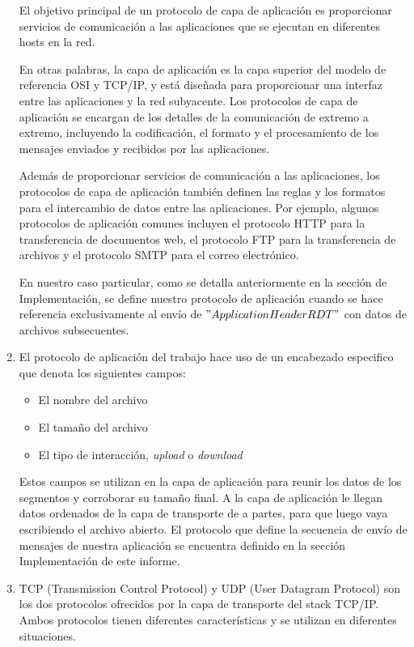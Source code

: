 \documentclass[11pt,a4paper]{article}
\begin{document}
\begin{enumerate}
    El objetivo principal de un protocolo de capa de aplicación es proporcionar servicios de comunicación a las aplicaciones que se ejecutan en diferentes hosts en la red.
    
    En otras palabras, la capa de aplicación es la capa superior del modelo de referencia OSI y TCP/IP, y está diseñada para proporcionar una interfaz entre las aplicaciones y la red subyacente. Los protocolos de capa de aplicación se encargan de los detalles de la comunicación de extremo a extremo, incluyendo la codificación, el formato y el procesamiento de los mensajes enviados y recibidos por las aplicaciones.
    
    Además de proporcionar servicios de comunicación a las aplicaciones, los protocolos de capa de aplicación también definen las reglas y los formatos para el intercambio de datos entre las aplicaciones. Por ejemplo, algunos protocolos de aplicación comunes incluyen el protocolo HTTP para la transferencia de documentos web, el protocolo FTP para la transferencia de archivos y el protocolo SMTP para el correo electrónico.

    En nuestro caso particular, como se detalla anteriormente en la sección de Implementación, se define nuestro protocolo de aplicación cuando se hace referencia exclusivamente al envío de $"ApplicationHeaderRDT"$ con datos de archivos subsecuentes.

    \item El protocolo de aplicación del trabajo hace uso de un encabezado especifico que denota los siguientes campos:
    \begin{itemize}
        \item El nombre del archivo
        \item El tamaño del archivo
        \item El tipo de interacción, \textit{upload} o \textit{download}
    \end{itemize}
    Estos campos se utilizan en la capa de aplicación para reunir los datos de los segmentos y corroborar su tamaño final. A la capa de aplicación le llegan datos ordenados de la capa de transporte de a partes, para que luego vaya escribiendo el archivo abierto.
    El protocolo que define la secuencia de envío de mensajes de nuestra aplicación se encuentra definido en la sección Implementación de este informe.
    \item TCP (Transmission Control Protocol) y UDP (User Datagram Protocol) son los dos protocolos ofrecidos por la capa de transporte del stack TCP/IP. Ambos protocolos tienen diferentes características y se utilizan en diferentes situaciones.
    

\end{enumerate}
\end{document}
